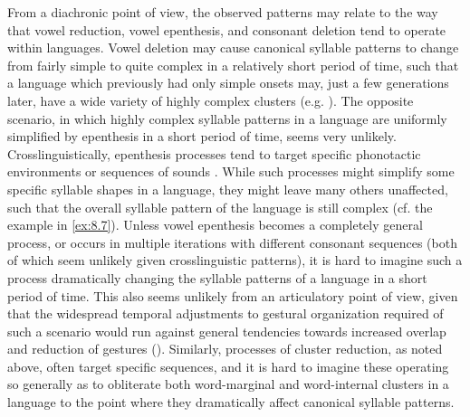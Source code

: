   From a diachronic point of view, the observed patterns may relate to the way that vowel reduction, vowel epenthesis, and consonant deletion tend to operate within languages. Vowel deletion may cause canonical syllable patterns to change from fairly simple to quite complex in a relatively short period of time, such that a language which previously had only simple onsets may, just a few generations later, have a wide variety of highly complex clusters (e.g. ). The opposite scenario, in which highly complex syllable patterns in a language are uniformly simplified by epenthesis in a short period of time, seems very unlikely. Crosslinguistically, epenthesis processes tend to target specific phonotactic environments or sequences of sounds \citep{Hall2011}. While such processes might simplify some specific syllable shapes in a language, they might leave many others unaffected, such that the overall syllable pattern of the language is still complex (cf. the  example in \ref{ex:8.7}). Unless vowel epenthesis becomes a completely general process, or occurs in multiple iterations with different consonant sequences (both of which seem unlikely given crosslinguistic patterns), it is hard to imagine such a process dramatically changing the syllable patterns of a language in a short period of time. This also seems unlikely from an articulatory point of view, given that the widespread temporal adjustments to gestural organization required of such a scenario would run against general tendencies towards increased overlap and reduction of gestures (\citealt{BrowmanGoldstein1992b}). Similarly, processes of cluster reduction, as noted above, often target specific sequences, and it is hard to imagine these operating so generally as to obliterate both word-marginal and word-internal clusters in a language to the point where they dramatically affect canonical syllable patterns. 

